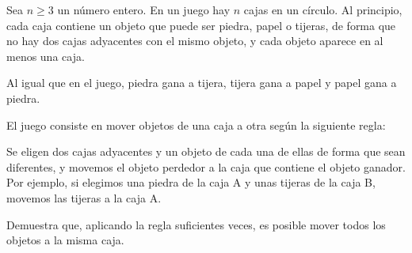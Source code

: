 Sea $n\ge 3$ un número entero. En un juego hay $n$ cajas en un círculo. Al principio, cada caja contiene un objeto que puede ser piedra, papel o tijeras, de forma que no hay dos cajas adyacentes con el mismo objeto, y cada objeto aparece en al menos una caja. 

Al igual que en el juego, piedra gana a tijera, tijera gana a papel y papel gana a piedra. 

El juego consiste en mover objetos de una caja a otra según la siguiente regla: 

Se eligen dos cajas adyacentes y un objeto de cada una de ellas de forma que sean diferentes, y movemos el objeto perdedor a la caja que contiene el objeto ganador. Por ejemplo, si elegimos una piedra de la caja A y unas tijeras de la caja B, movemos las tijeras a la caja A.

Demuestra que, aplicando la regla suficientes veces, es posible mover todos los objetos a la misma caja.
